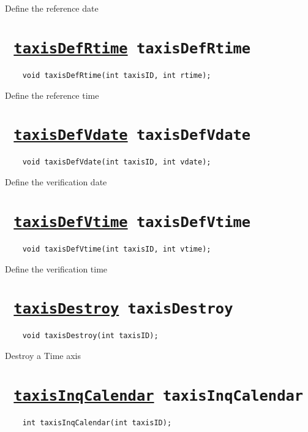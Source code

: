 Define the reference date
\ifpdfoutput{}{(\ref{taxisDefRdate})}


\section*{\tt 
\ifpdf
\hyperref[taxisDefRtime]{taxisDefRtime}
\else
taxisDefRtime
\fi
}
\begin{verbatim}
    void taxisDefRtime(int taxisID, int rtime);
\end{verbatim}

Define the reference time
\ifpdfoutput{}{(\ref{taxisDefRtime})}


\section*{\tt 
\ifpdf
\hyperref[taxisDefVdate]{taxisDefVdate}
\else
taxisDefVdate
\fi
}
\begin{verbatim}
    void taxisDefVdate(int taxisID, int vdate);
\end{verbatim}

Define the verification date
\ifpdfoutput{}{(\ref{taxisDefVdate})}


\section*{\tt 
\ifpdf
\hyperref[taxisDefVtime]{taxisDefVtime}
\else
taxisDefVtime
\fi
}
\begin{verbatim}
    void taxisDefVtime(int taxisID, int vtime);
\end{verbatim}

Define the verification time
\ifpdfoutput{}{(\ref{taxisDefVtime})}


\section*{\tt 
\ifpdf
\hyperref[taxisDestroy]{taxisDestroy}
\else
taxisDestroy
\fi
}
\begin{verbatim}
    void taxisDestroy(int taxisID);
\end{verbatim}

Destroy a Time axis
\ifpdfoutput{}{(\ref{taxisDestroy})}


\section*{\tt 
\ifpdf
\hyperref[taxisInqCalendar]{taxisInqCalendar}
\else
taxisInqCalendar
\fi
}
\begin{verbatim}
    int taxisInqCalendar(int taxisID);
\end{verbatim}

